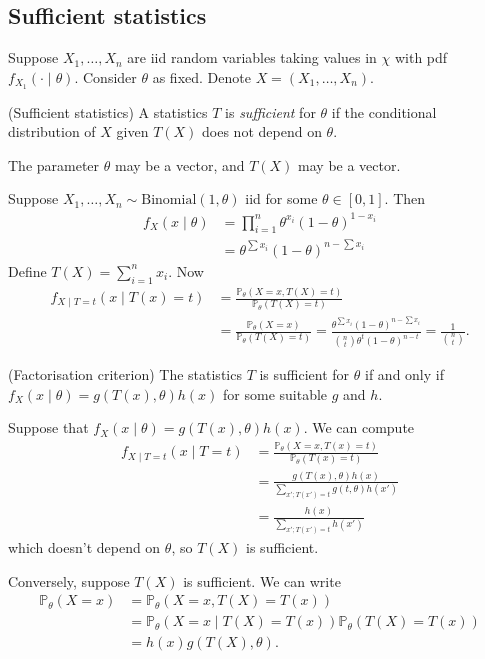 \documentclass{article}
\begin{document}
\subsection{Sufficient statistics}
Suppose $ X_1,\dots, X_n $ are iid random variables taking values in $ \chi $ with pdf $ f_{X_1}(\cdot\mid \theta) $. Consider $ \theta $ as fixed. Denote $ X=(X_1,\dots, X_n) $.
\begin{definition}
(Sufficient statistics) A statistics $ T $ is \textit{sufficient} for $ \theta $ if the conditional distribution of $ X$ given $ T(X) $ does not depend on $ \theta $.
\end{definition}
\begin{remark}
  The parameter $ \theta $ may be a vector, and $ T(X) $ may be a vector.
\end{remark}
Suppose $ X_1,\dots, X_n \sim \mathrm{Binomial}(1,\theta) $ iid for some $ \theta\in [0,1] $. Then 
\begin{align*}
	f_X(x\mid \theta)&=\prod_{i=1}^n \theta^{x_i}(1-\theta)^{1-x_i}\\
			 &= \theta^{\sum x_i}(1-\theta)^{n-\sum x_i}
\end{align*}
Define $ T(X)=\sum_{i=1}^n x_i $. Now 
\begin{align*}
	f_{X\mid T =t}(x\mid T(x)=t)&=\frac{\mathbb P_\theta(X=x,T(X)=t)}{\mathbb P_\theta(T(X) =t)}\\
				    &= \frac{\mathbb P_\theta(X=x)}{\mathbb P_\theta(T(X)=t)} = \frac{\theta^{\sum x_i}(1-\theta)^{n-\sum x_i}}{\binom nt \theta^t (1-\theta)^{n-t}} = \frac 1{\binom nt}.
\end{align*}
\begin{theorem}
	(Factorisation criterion) The statistics $ T $ is sufficient for $ \theta $ if and only if $ f_X(x\mid \theta)= g(T(x),\theta)h(x) $ for some suitable $ g $ and $ h $.
\end{theorem}
\pf Suppose that $ f_X(x\mid \theta) = g(T(x),\theta)h(x) $. We can compute
\begin{align*}
	f_{X\mid T=t}(x\mid T=t) &= \frac{\mathbb P_\theta(X=x,T(x) =t)}{\mathbb P_\theta(T(x)=t)}\\
				 &= \frac{g(T(x),\theta)h(x)}{\sum_{x';T(x')=t}g(t,\theta)h(x')}\\
				 &= \frac{h(x)}{\sum_{x';T(x')=t}h(x')}
\end{align*}
which doesn't depend on $ \theta $, so $ T(X) $ is sufficient.\par
Conversely, suppose $ T(X) $ is sufficient. We can write
\begin{align*}
\mathbb P_\theta(X=x) &= \mathbb P_\theta(X=x,T(X)=T(x))\\
		      &= \mathbb P_\theta(X=x\mid T(X)=T(x))\mathbb P_\theta(T(X)=T(x))\\
		      &= h(x)g(T(X),\theta).
\end{align*}
\end{document}

